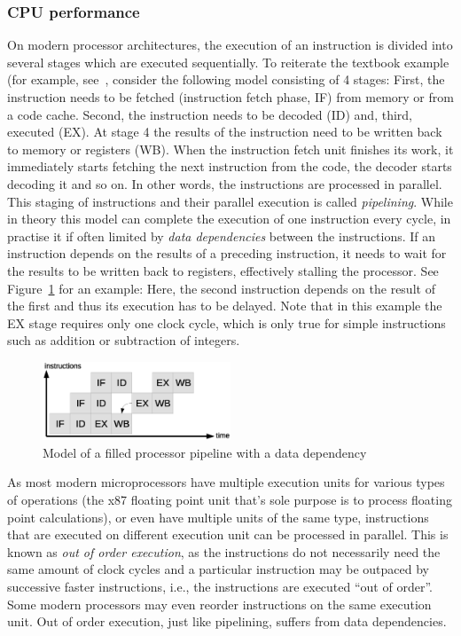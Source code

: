 \subsubsection{CPU performance}
On modern processor architectures, the execution of an instruction is divided into several stages which are executed sequentially. To reiterate the textbook example (for example, see~\cite[p. 411]{murdocca1999computer}, consider the following model consisting of 4 stages: First, the instruction needs to be fetched (instruction fetch phase, IF) from memory or from a code cache. Second, the instruction needs to be decoded (ID) and, third, executed (EX). At stage 4 the results of the instruction need to be written back to memory or registers (WB). When the instruction fetch unit finishes its work, it immediately starts fetching the next instruction from the code, the decoder starts decoding it and so on. In other words, the instructions are processed in parallel. This staging of instructions and their parallel execution is called \emph{pipelining}. While in theory this model can complete the execution of one instruction every cycle, in practise it if often limited by \emph{data dependencies} between the instructions. If an instruction depends on the results of a preceding instruction, it needs to wait for the results to be written back to registers, effectively stalling the processor. See Figure~\ref{fig:pipeline} for an example: Here, the second instruction depends on the result of the first and thus its execution has to be delayed. Note that in this example the EX stage requires only one clock cycle, which is only true for simple instructions such as addition or subtraction of integers.

\begin{figure}[h]
\begin{center}
\includegraphics[width=0.5\textwidth]{img/pipeline}
\end{center}
\caption{Model of a filled processor pipeline with a data dependency}
\label{fig:pipeline}
\end{figure}

As most modern microprocessors have multiple execution units for various types of operations (\eg the x87 floating point unit that's sole purpose is to process floating point calculations), or even have multiple units of the same type, instructions that are executed on different execution unit can be processed in parallel. This is known as \emph{out of order execution}, as the instructions do not necessarily need the same amount of clock cycles and a particular instruction may be outpaced by successive faster instructions, i.e., the instructions are executed ``out of order''. Some modern processors may even reorder instructions on the same execution unit. Out of order execution, just like pipelining, suffers from data dependencies.

